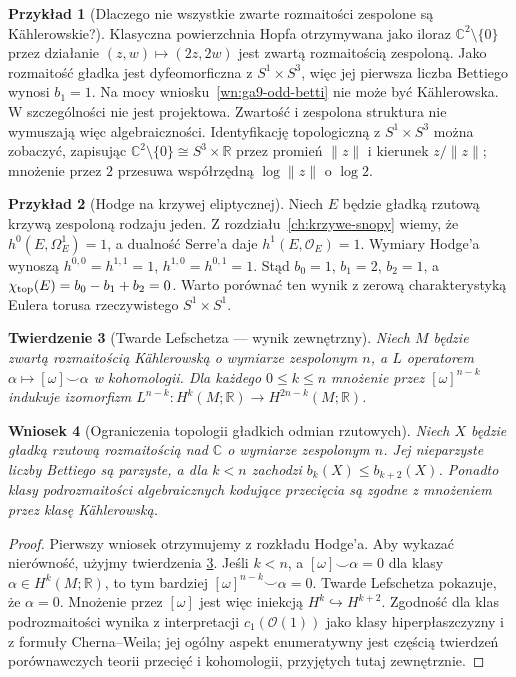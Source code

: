 \documentclass[11pt,a4paper,openany]{report}
\numberwithin{equation}{section}
\theoremstyle{plain}
\newtheorem{twierdzenie}{Twierdzenie}[section]
\newtheorem{wniosek}[twierdzenie]{Wniosek}
\theoremstyle{definition}
\newtheorem{przyklad}[twierdzenie]{Przykład}
\theoremstyle{remark}
\newcommand{\R}{\mathbb R}
\newcommand{\C}{\mathbb C}
\begin{document}
\begin{przyklad}[Dlaczego nie wszystkie zwarte rozmaitości zespolone są Kählerowskie?]
Klasyczna powierzchnia Hopfa otrzymywana jako iloraz
$\C^2\setminus\{0\}$ przez działanie
$(z,w)\mapsto(2z,2w)$ jest zwartą rozmaitością zespoloną.
Jako rozmaitość gładka jest dyfeomorficzna z
$S^1\times S^3$, więc jej pierwsza liczba Bettiego
wynosi $b_1=1$. Na mocy
wniosku~\ref{wn:ga9-odd-betti} nie może być Kählerowska.
W szczególności nie jest projektowa. Zwartość
i zespolona struktura nie wymuszają więc algebraiczności.
Identyfikację topologiczną z $S^1\times S^3$
można zobaczyć, zapisując $\C^2\setminus\{0\}
\cong S^3\times\R$ przez promień $\|z\|$ i kierunek
$z/\|z\|$; mnożenie przez $2$ przesuwa współrzędną
$\log\|z\|$ o $\log2$.
\end{przyklad}

\begin{przyklad}[Hodge na krzywej eliptycznej]
Niech $E$ będzie gładką rzutową krzywą zespoloną
rodzaju jeden. Z rozdziału~\ref{ch:krzywe-snopy}
wiemy, że $h^0(E,\Omega_E^1)=1$, a dualność
Serre'a daje $h^1(E,\mathcal O_E)=1$.
Wymiary Hodge'a wynoszą
$h^{0,0}=h^{1,1}=1$, $h^{1,0}=h^{0,1}=1$.
Stąd $b_0=1$, $b_1=2$, $b_2=1$, a
$\chi_{\rm top}(E)=b_0-b_1+b_2=0$.
Warto porównać ten wynik z zerową charakterystyką
Eulera torusa rzeczywistego $S^1\times S^1$.
\end{przyklad}

\begin{twierdzenie}[Twarde Lefschetza — wynik zewnętrzny]
\label{tw:ga9-hard-lefschetz}
Niech $M$ będzie zwartą rozmaitością Kählerowską
o wymiarze zespolonym $n$, a $L$ operatorem
$\alpha\mapsto[\omega]\smile\alpha$ w kohomologii.
Dla każdego $0\le k\le n$ mnożenie przez
$[\omega]^{n-k}$ indukuje izomorfizm
$L^{n-k}:H^k(M;\R)\to H^{2n-k}(M;\R)$.
\end{twierdzenie}

\begin{wniosek}[Ograniczenia topologii gładkich odmian rzutowych]
Niech $X$ będzie gładką rzutową rozmaitością nad $\C$
o wymiarze zespolonym $n$. Jej nieparzyste liczby
Bettiego są parzyste, a dla $k<n$ zachodzi
$b_k(X)\le b_{k+2}(X)$. Ponadto klasy podrozmaitości
algebraicznych kodujące przecięcia są zgodne z
mnożeniem przez klasę Kählerowską.
\end{wniosek}
\begin{proof}
Pierwszy wniosek otrzymujemy z rozkładu Hodge'a.
Aby wykazać nierówność, użyjmy twierdzenia
\ref{tw:ga9-hard-lefschetz}. Jeśli $k<n$, a
$[\omega]\smile\alpha=0$ dla klasy
$\alpha\in H^k(M;\R)$, to tym bardziej
$[\omega]^{n-k}\smile\alpha=0$. Twarde Lefschetza
pokazuje, że $\alpha=0$. Mnożenie przez $[\omega]$
jest więc iniekcją $H^k\hookrightarrow H^{k+2}$.
Zgodność dla klas podrozmaitości wynika z
interpretacji $c_1(\mathcal O(1))$ jako klasy
hiperpłaszczyzny i z formuły Cherna--Weila;
jej ogólny aspekt enumeratywny jest częścią
twierdzeń porównawczych teorii przecięć i
kohomologii, przyjętych tutaj zewnętrznie.
\end{proof}
\end{document}
